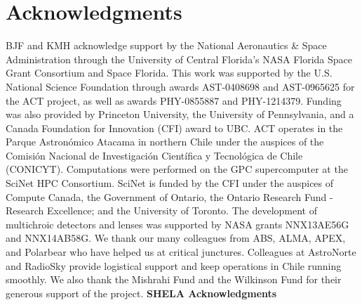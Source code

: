 \documentclass[a4paper,fleqn,usenatbib]{mnras}
\begin{document}
\section*{Acknowledgments}
BJF and KMH acknowledge support by the National Aeronautics \& Space Administration through the University of Central Florida's NASA Florida Space Grant Consortium and Space Florida.  This work was supported by the U.S. National Science Foundation through awards AST-0408698 and AST-0965625 for the ACT project, as well as awards PHY-0855887 and PHY-1214379. Funding was also provided by Princeton University, the University of Pennsylvania, and a Canada Foundation for Innovation (CFI) award to UBC. ACT operates in the Parque Astron\'omico Atacama in northern Chile under the auspices of the Comisi\'on Nacional de Investigaci\'on Cient\'ifica y Tecnol\'ogica de Chile (CONICYT). Computations were performed on the GPC supercomputer at the SciNet HPC Consortium. SciNet is funded by the CFI under the auspices of Compute Canada, the Government of Ontario, the Ontario Research Fund - Research Excellence; and the University of Toronto. The development of multichroic detectors and lenses was supported by NASA grants NNX13AE56G and NNX14AB58G. We thank our many colleagues from ABS, ALMA, APEX, and Polarbear who have helped us at critical junctures. Colleagues at AstroNorte and RadioSky provide logistical support and keep operations in Chile running smoothly. We also thank the Mishrahi Fund and the Wilkinson Fund for their generous support of the project. %
\textbf{SHELA Acknowledgments}





 




\bsp	%
\label{lastpage}
\end{document}
